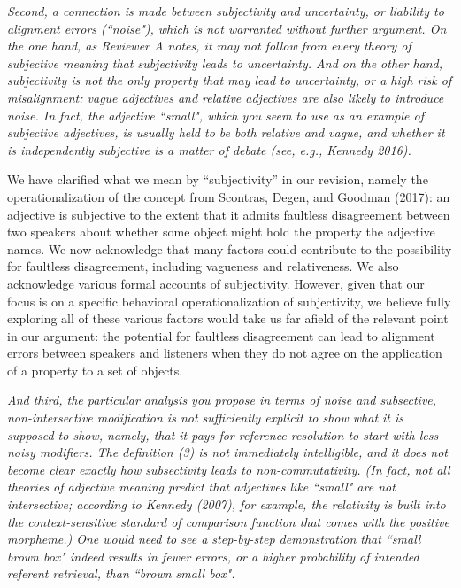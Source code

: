 \documentclass[12pt]{article}
\begin{document}
\item \emph{Second, a connection is made between subjectivity and uncertainty, or
	liability to alignment errors (``noise"), which is not warranted without
	further argument. On the one hand, as Reviewer A notes, it may not follow
	from every theory of subjective meaning that subjectivity leads to
	uncertainty. And on the other hand, subjectivity is not the only property
	that may lead to uncertainty, or a high risk of misalignment: vague
	adjectives and relative adjectives are also likely to introduce noise. In
	fact, the adjective ``small", which you seem to use as an example of
	subjective adjectives, is usually held to be both relative and vague, and
	whether it is independently subjective is a matter of debate (see, e.g.,
	Kennedy 2016).}

	We have clarified what we mean by ``subjectivity'' in our revision, namely the operationalization of the concept from Scontras, Degen, and Goodman (2017): an adjective is subjective to the extent that it admits faultless disagreement between two speakers about whether some object might hold the property the adjective names. We now acknowledge that many factors could contribute to the possibility for faultless disagreement, including vagueness and relativeness. We also acknowledge various formal accounts of subjectivity. However, given that our focus is on a specific behavioral operationalization of subjectivity, we believe fully exploring all of these various factors would take us far afield of the relevant point in our argument: the potential for faultless disagreement can lead to alignment errors between speakers and listeners when they do not agree on the application of a property to a set of objects.
	
\item \emph{And third, the particular analysis you propose in terms of noise and
	subsective, non-intersective modification is not sufficiently explicit to
	show what it is supposed to show, namely, that it pays for reference
	resolution to start with less noisy modifiers. The definition (3) is not
	immediately intelligible, and it does not become clear exactly how
	subsectivity leads to non-commutativity. (In fact, not all theories of
	adjective meaning predict that adjectives like ``small" are not intersective;
	according to Kennedy (2007), for example, the relativity is built into the
	context-sensitive standard of comparison function that comes with the
	positive morpheme.) One would need to see a step-by-step demonstration that
	``small brown box" indeed results in fewer errors, or a higher probability of
	intended referent retrieval, than ``brown small box".}
\end{document}
